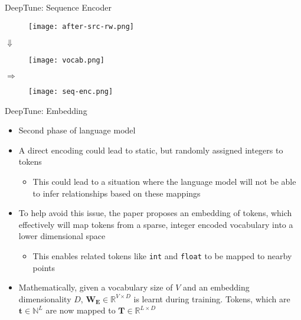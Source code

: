 \documentclass[10pt]{beamer}
\begin{document}
\begin{frame}{DeepTune: Sequence Encoder}
\begin{minipage}{0.45\linewidth}
\begin{figure}[H]
\centering
\texttt{[image: after-src-rw.png]}
\end{figure}
\begin{center}
\Large\(\Downarrow\)
\end{center}
\begin{figure}[H]
\centering
\texttt{[image: vocab.png]}
\end{figure}
\end{minipage}
\Large\(\Rightarrow\)\hfill
\begin{minipage}{0.45\linewidth}
\begin{figure}[H]
\centering
\texttt{[image: seq-enc.png]}
\end{figure}
\end{minipage}
\end{frame}

\begin{frame}{DeepTune: Embedding}
\begin{itemize}
\item<1->{Second phase of language model}
\item<2->{A direct encoding could lead to static, but randomly assigned integers to tokens
          \begin{itemize}
          \item<3->{This could lead to a situation where the language model will not be able to infer relationships based on these mappings}
          \end{itemize}}
\item<4->{To help avoid this issue, the paper proposes an embedding of tokens, which effectively will map tokens from a sparse, integer encoded vocabulary into a lower dimensional space
          \begin{itemize}
          \item<5->{This enables related tokens like \texttt{int} and \texttt{float} to be mapped to nearby points}
          \end{itemize}}
\item<6->{Mathematically, given a vocabulary size of \(V\) and an embedding dimensionality \(D\), \(\mathbf{W_{E}} \in \mathbb{R}^{V \times D}\) is learnt during training. Tokens, which are \(\mathbf{t} \in \mathbb{N}^{L}\) are now mapped to \(\mathbf{T} \in \mathbb{R}^{L \times D}\)}
\end{itemize}
\end{frame}
\end{document}
